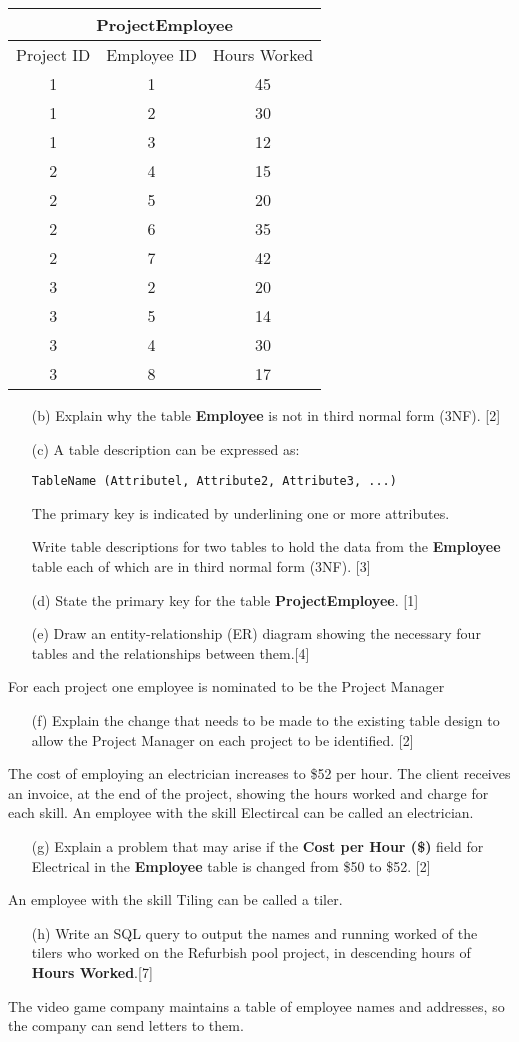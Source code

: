 \begin{tabular}{|c|c|c|}
\hline 
\multicolumn{3}{|c|}{ProjectEmployee}\tabularnewline
\hline 
Project ID & Employee ID & Hours Worked\tabularnewline
\hline 
1 & 1 & 45\tabularnewline
\hline 
1 & 2 & 30\tabularnewline
\hline 
1 & 3 & 12\tabularnewline
\hline 
2 & 4 & 15\tabularnewline
\hline 
2 & 5 & 20\tabularnewline
\hline 
2 & 6 & 35\tabularnewline
\hline 
2 & 7 & 42\tabularnewline
\hline 
3 & 2 & 20\tabularnewline
\hline 
3 & 5 & 14\tabularnewline
\hline 
3 & 4 & 30\tabularnewline
\hline 
3 & 8 & 17\tabularnewline
\hline 
\end{tabular}
\begin{enumerate}
\item[(b)]  Explain why the table \textbf{Employee} is not in third normal form
(3NF). \hfill{}{[}2{]}
\item[(c)]  A table description can be expressed as:

\texttt{TableName (Attributel, Attribute2, Attribute3, ...)}

The primary key is indicated by underlining one or more attributes.

Write table descriptions for two tables to hold the data from the
\textbf{Employee} table each of which are in third normal form (3NF).
\hfill{}{[}3{]}
\item[(d)]  State the primary key for the table \textbf{ProjectEmployee}.\hfill{}
{[}1{]}
\item[(e)]  Draw an entity-relationship (ER) diagram showing the necessary four
tables and the relationships between them.\hfill{}{[}4{]}
\end{enumerate}
For each project one employee is nominated to be the Project Manager
\begin{enumerate}
\item[(f)]  Explain the change that needs to be made to the existing table design
to allow the Project Manager on each project to be identified.\hfill{}
{[}2{]}
\end{enumerate}
The cost of employing an electrician increases to \$52 per hour. The
client receives an invoice, at the end of the project, showing the
hours worked and charge for each skill. An employee with the skill
Electircal can be called an electrician.
\begin{enumerate}
\item[(g)]  Explain a problem that may arise if the \textbf{Cost per Hour (\$)}
field for Electrical in the \textbf{Employee} table is changed from
\$50 to \$52. \hfill{}{[}2{]}
\end{enumerate}
An employee with the skill Tiling can be called a tiler.
\begin{enumerate}
\item[(h)] Write an SQL query to output the names and running worked of the
tilers who worked on the Refurbish pool project, in descending hours
of \textbf{Hours Worked}.\hfill{}{[}7{]}
\end{enumerate}
The video game company maintains a table of employee names and addresses,
so the company can send letters to them.

